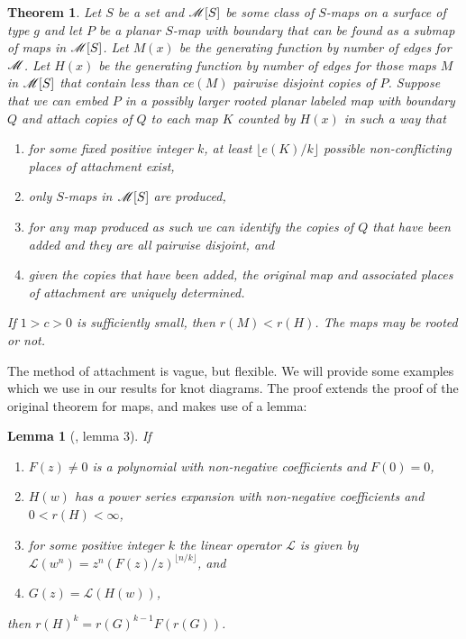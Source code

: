 \documentclass[amsmath,longbibliography,secnumarabic,floatfix,amssymb,nofootinbib,nobibnotes,letterpaper,11pt,notitlepage,tightenlines]{revtex4-1}
\newtheorem{theorem}{Theorem}
\newtheorem*{lemma*}{Lemma}
\begin{document}
\begin{theorem}Let $S$ be a set and $\mathscr{M}[S]$ be some class of
  $S$-maps on a surface of type $g$ and let $P$ be a planar $S$-map
  with boundary that can be found as a submap of maps in
  $\mathscr{M}[S]$. Let $M(x)$ be the generating function by number of
  edges for $\mathscr{M}$. Let $H(x)$ be the generating function by
  number of edges for those maps $M$ in $\mathscr{M}[S]$ that contain
  less than $ce(M)$ pairwise disjoint copies of $P$. Suppose that we
  can embed $P$ in a possibly larger rooted planar labeled map with
  boundary $Q$ and attach copies of $Q$ to each map $K$
  counted by $H(x)$ in such a way that
  \begin{enumerate}
  \item for some fixed positive integer $k$, at least $\lfloor e(K)/k \rfloor$ possible
    non-conflicting places of attachment exist,
  \item only $S$-maps in $\mathscr{M}[S]$ are produced,
  \item for any map produced as such we can identify the copies of $Q$ that have been added and they
    are all pairwise disjoint, and
  \item given the copies that have been added, the original map and associated places of attachment
    are uniquely determined.
  \end{enumerate} If $1 > c > 0$ is sufficiently small, then $r(M) < r(H)$. The maps may be rooted or
  not.
  \label{thr:weakpattern}
\end{theorem}

The method of attachment is vague, but flexible. We will provide some examples which we use in our
results for knot diagrams. The proof extends the proof of the original theorem for maps, and makes
use of a lemma:


\begin{lemma*}[\cite{Bender1992104}, lemma 3]
 If
 \begin{enumerate}
 \item $F(z) \ne 0$ is a polynomial with non-negative coefficients and $F(0) = 0$,
 \item $H(w)$ has a power series expansion with non-negative coefficients and $0 < r(H) < \infty$,
 \item for some positive integer $k$ the linear operator $\mathscr{L}$ is given by $\mathscr{L}(w^n)
   = z^n(F(z)/z)^{\lfloor n/k \rfloor}$, and
 \item $G(z) = \mathscr{L}(H(w))$,
 \end{enumerate}
 then $r(H)^k = r(G)^{k-1}F(r(G))$.
\end{lemma*}
\end{document}
